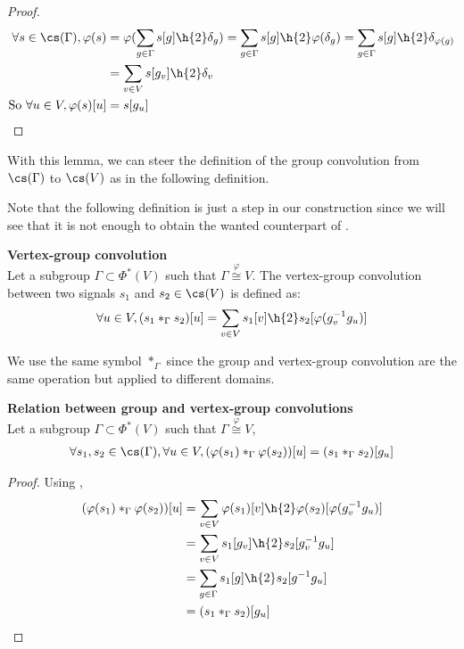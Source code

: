 \begin{proof}
\begin{align*}
\forall s \in \cs(\Gamma), \varphi(s) & = \varphi(\displaystyle \sum_{g \in \Gamma} s[g] \h{2} \delta_g)
 = \displaystyle \sum_{g \in \Gamma} s[g] \h{2} \varphi(\delta_g)
 = \displaystyle \sum_{g \in \Gamma} s[g] \h{2} \delta_{\varphi(g)}\\
 & = \displaystyle \sum_{v \in V} s[g_v] \h{2} \delta_v\\
 \text{So }\forall u \in V, \varphi(s) [u] & = s[g_u]
\end{align*}
\end{proof}

With this lemma, we can steer the definition of the group convolution from $\cs(\Gamma)$ to $\cs(V)$ as in the following definition.

\begin{remark}
Note that the following definition is just a step in our construction since we will see that it is not enough to obtain the wanted counterpart of .
\end{remark}

\begin{definition}\textbf{Vertex-group convolution}\\
Let a subgroup $\Gamma \subset \Phi^*(V)$ such that $\Gamma \overset{\varphi}{\cong} V$.
The vertex-group convolution between two signals $s_1$ and $s_2 \in \cs(V)$ is defined as:
\begin{gather*}
\forall u \in V, (s_1 \ast_{\Gamma} s_2) [u] = \displaystyle \sum_{v \in V} s_1[v] \h{2} s_2[\varphi(g_v^{-1}g_u)]
\end{gather*}
\label{def:conv2}
\end{definition}

We use the same symbol $\ast_\Gamma$ since the group and vertex-group convolution are the same operation but applied to different domains.

\begin{lemma}\textbf{Relation between group and vertex-group convolutions}\\
Let a subgroup $\Gamma \subset \Phi^*(V)$ such that $\Gamma \overset{\varphi}{\cong} V$,
\begin{gather*}
\forall s_1, s_2 \in \cs(\Gamma), \forall u \in V,
(\varphi(s_1) \ast_{\Gamma} \varphi(s_2))[u] = (s_1 \ast_{\Gamma} s_2)[g_u]
\end{gather*}
\label{lem:rel12}
\end{lemma}
\begin{proof}
Using ,
\begin{align*}
(\varphi(s_1) \ast_{\Gamma} \varphi(s_2))[u] & = \displaystyle \sum_{v \in V} \varphi(s_1)[v] \h{2} \varphi(s_2)[\varphi(g_v^{-1}g_u)]\\
 & = \displaystyle \sum_{v \in V} s_1[g_v] \h{2} s_2[g_v^{-1}g_u]\\
 & = \displaystyle \sum_{g \in \Gamma} s_1[g] \h{2} s_2[g^{-1}g_u]\\
 & = (s_1 \ast_{\Gamma} s_2)[g_u]
\end{align*}
\end{proof}

